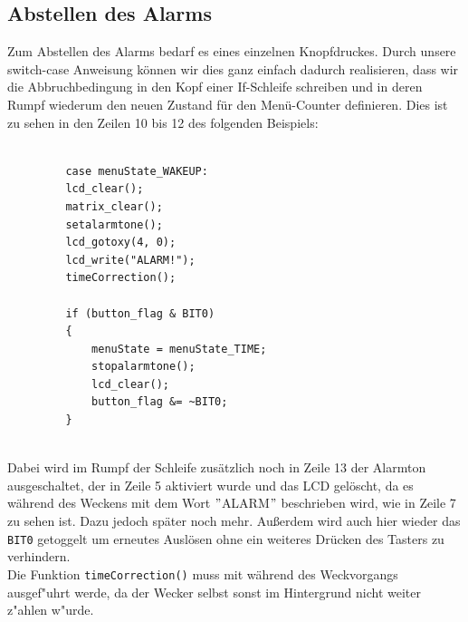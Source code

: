 \documentclass[openright,twoside,11pt,a4paper]{scrartcl}
\begin{document}
\begin{flushleft}
	 	\subsection{Abstellen des Alarms}
	 	Zum Abstellen des Alarms bedarf es eines einzelnen Knopfdruckes. Durch unsere switch-case Anweisung können wir dies ganz einfach dadurch realisieren, dass wir die Abbruchbedingung in den Kopf einer If-Schleife schreiben und in deren Rumpf wiederum den neuen Zustand für den Menü-Counter definieren. Dies ist zu sehen in den Zeilen 10 bis 12 des folgenden Beispiels:
	 	\begin{lstlisting}
	 	 
	 	 case menuState_WAKEUP:
	 	 lcd_clear();
	 	 matrix_clear();
	 	 setalarmtone();
	 	 lcd_gotoxy(4, 0);
	 	 lcd_write("ALARM!");
	 	 timeCorrection();
	 	 
	 	 if (button_flag & BIT0)
	 	 {
		 	 menuState = menuState_TIME;
		 	 stopalarmtone();
		 	 lcd_clear();
		 	 button_flag &= ~BIT0;
	 	 }
	 	 
	 	\end{lstlisting}
	 	Dabei wird im Rumpf der Schleife zusätzlich noch in Zeile 13 der Alarmton ausgeschaltet, der in Zeile 5 aktiviert wurde und das LCD gelöscht, da es während des Weckens mit dem Wort $"$ALARM$"$ beschrieben wird, wie in Zeile 7 zu sehen ist. Dazu jedoch später noch mehr. Außerdem wird auch hier wieder das \lstinline[]|BIT0| getoggelt um erneutes Auslösen ohne ein weiteres Drücken des Tasters zu verhindern.\\
	 	Die Funktion \lstinline[language=c==++]|timeCorrection()| muss mit während des Weckvorgangs ausgef"uhrt werde, da der Wecker selbst sonst im Hintergrund nicht weiter z"ahlen w"urde. \\
	 

\end{flushleft}
\end{document}
